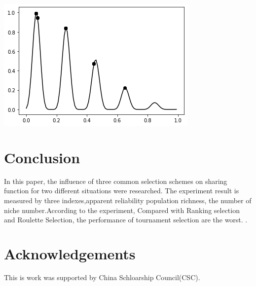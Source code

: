 \documentclass[smallextended]{svjour3}       %
\begin{document}
\begin{multicols}{2}
\begin{center}
  \includegraphics[width=\linewidth]{GA_images/example-composite-sin-result.png}
\end{center}


\section{Conclusion}
In this paper, the influence of three common selection schemes on sharing
function for two different situations were researched.  The experiment result is measured by three
indexes,apparent reliability population richness, the number of niche
number.According to the experiment, Compared with Ranking selection and Roulette
Selection, the performance of tournament selection are the worst. 
. 

\section{Acknowledgements}
This is work was supported by China Schloarship Council(CSC).

%


\end{multicols}
\end{document}
